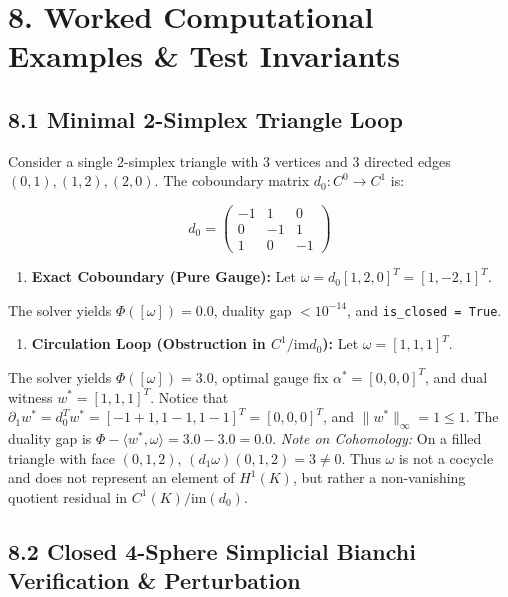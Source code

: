 \documentclass[11pt]{article}
\begin{document}
\section{\texorpdfstring{8. Worked Computational Examples \& Test Invariants}{8. Worked Computational Examples \& Test Invariants}}

\subsection{\texorpdfstring{8.1 Minimal 2-Simplex Triangle Loop}{8.1 Minimal 2-Simplex Triangle Loop}}

Consider a single 2-simplex triangle with 3 vertices and 3 directed edges $(0,1), (1,2), (2,0)$. The coboundary matrix $d_0: C^0 \to C^1$ is:

\begin{equation*}
d_0 = \begin{pmatrix} -1 & 1 & 0 \\ 0 & -1 & 1 \\ 1 & 0 & -1 \end{pmatrix}
\end{equation*}

\begin{enumerate}[leftmargin=1.4em,itemsep=0.2em]
\item \textbf{Exact Coboundary (Pure Gauge):} Let $\omega = d_0 [1, 2, 0]^T = [1, -2, 1]^T$.
\end{enumerate}
The solver yields $\Phi([\omega]) = 0.0$, duality gap $< 10^{-14}$, and \texttt{is\_closed = True}.

\begin{enumerate}[leftmargin=1.4em,itemsep=0.2em]
\item \textbf{Circulation Loop (Obstruction in $C^1 / \mathrm{im} d_0$):} Let $\omega = [1, 1, 1]^T$.
\end{enumerate}
The solver yields $\Phi([\omega]) = 3.0$, optimal gauge fix $\alpha^* = [0, 0, 0]^T$, and dual witness $w^* = [1, 1, 1]^T$. Notice that $\partial_1 w^* = d_0^T w^* = [-1+1, 1-1, 1-1]^T = [0, 0, 0]^T$, and $\|w^*\|_\infty = 1 \le 1$. The duality gap is $\Phi - \langle w^*, \omega \rangle = 3.0 - 3.0 = 0.0$. \emph{Note on Cohomology:} On a filled triangle with face $(0,1,2)$, $(d_1 \omega)(0,1,2) = 3 \ne 0$. Thus $\omega$ is not a cocycle and does not represent an element of $H^1(K)$, but rather a non-vanishing quotient residual in $C^1(K) / \mathrm{im}(d_0)$.

\subsection{\texorpdfstring{8.2 Closed 4-Sphere Simplicial Bianchi Verification \& Perturbation}{8.2 Closed 4-Sphere Simplicial Bianchi Verification \& Perturbation}}
\end{document}
